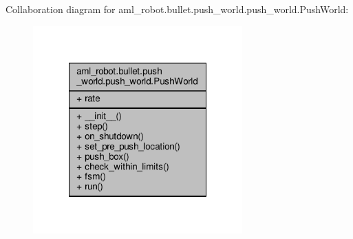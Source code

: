 Collaboration diagram for aml\-\_\-robot.\-bullet.\-push\-\_\-world.\-push\-\_\-world.\-Push\-World\-:\nopagebreak
\begin{figure}[H]
\begin{center}
\leavevmode
\includegraphics[width=228pt]{classaml__robot_1_1bullet_1_1push__world_1_1push__world_1_1_push_world__coll__graph}
\end{center}
\end{figure}
